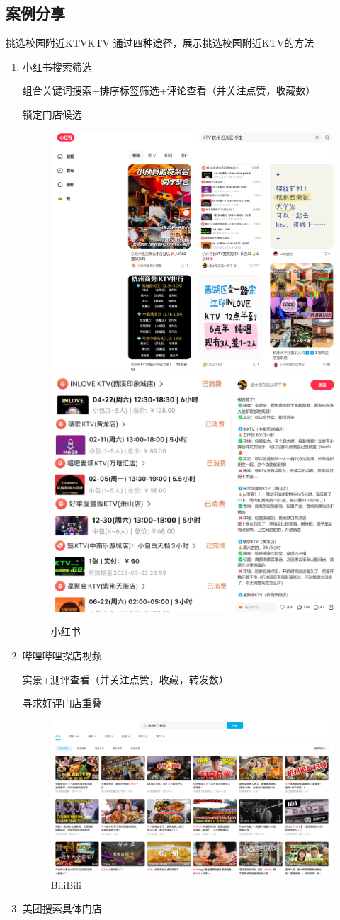 \subsection{案例分享}
\begin{exbox}{挑选校园附近KTV}{KTV}
  通过四种途径，展示挑选校园附近KTV的方法
  \tcblower
  \begin{enumerate}
    \item 小红书搜索筛选

    组合关键词搜索+排序标签筛选+评论查看（并关注点赞，收藏数）

    锁定门店候选
    \begin{figure}[H]
      \centering
      \includegraphics[width=.4\textwidth]{./figures/生活/ktv/1.png}
      \qquad
      \includegraphics[width=.4\textwidth]{./figures/生活/ktv/2.png}
      \caption{小红书}
    \end{figure}

  \item 哔哩哔哩探店视频

  实景+测评查看（并关注点赞，收藏，转发数）

  寻求好评门店重叠

  \begin{figure}[H]
    \centering
    \includegraphics[width=.8\textwidth]{./figures/生活/ktv/bili.png}
    \caption{BiliBili}
  \end{figure}
  \item 美团搜索具体门店


\end{enumerate}
\end{exbox}
